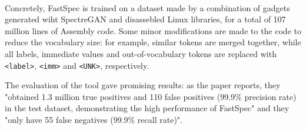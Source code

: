 \documentclass[12pt,a4paper]{book}
\theoremstyle{definition}
\begin{document}
	\paragraph{} Concretely, FastSpec is trained on a dataset made by a combination of gadgets generated wiht SpectreGAN and disassebled Linux libraries, for a total of 107 million lines of Assembly code. Some minor modifications are made to the code to reduce the vocabulary size: for example, similar tokens are merged together, while all labels, immediate values and out-of-vocabulary tokens are replaced with \texttt{<label>}, \texttt{<imm>} and \texttt{<UNK>}, respectively.
	
	The evaluation of the tool gave promising results: as the paper reports, they "obtained 1.3 million true positives and 110 false positives (99.9\% precision rate) in the test dataset, demonstrating the high performance of FastSpec" and they "only have 55 false negatives (99.9\% recall rate)".
\end{document}
